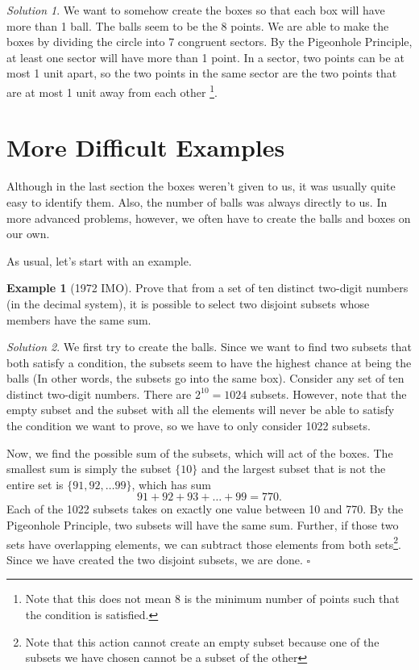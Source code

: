 \documentclass[l1pt]{article}
\theoremstyle{plain}
\theoremstyle{definition}
\newtheorem{example}[thm]{Example}
\theoremstyle{remark}
\newtheorem*{solution}{Solution}
\begin{document}
\begin{solution}
We want to somehow create the boxes so that each box will have more than 1 ball. The balls seem to be the 8 points. We are able to make the boxes by dividing the circle into 7 congruent sectors. By the Pigeonhole Principle, at least one sector will have more than 1 point. In a sector, two points can be at most 1 unit apart, so the two points in the same sector are the two points that are at most 1 unit away from each other \footnote{Note that this does not mean 8 is the minimum number of points such that the condition is satisfied.}. 
\end{solution}

\bigskip

\section{More Difficult Examples}

Although in the last section the boxes weren't given to us, it was usually quite easy to identify them. Also, the number of balls was always directly to us. In more advanced problems, however, we often have to create the balls and boxes on our own. 

\bigskip

As usual, let's start with an example.

\begin{example}[1972 IMO]
Prove that from a set of ten distinct two-digit numbers (in the decimal system), it is possible to select two disjoint subsets whose members have the same sum.
\end{example}

\begin{solution}
We first try to create the balls. Since we want to find two subsets that both satisfy a condition, the subsets seem to have the highest chance at being the balls (In other words, the subsets go into the same box). Consider any set of ten distinct two-digit numbers. There are $2^{10}=1024$ subsets. However, note that the empty subset and the subset with all the elements will never be able to satisfy the condition we want to prove, so we have to only consider 1022 subsets.

Now, we find the possible sum of the subsets, which will act of the boxes. The smallest sum is simply the subset $\{10\}$ and the largest subset that is not the entire set is $\{91, 92, \dots 99\}$, which has sum \[91+92+93+\dots+99=770.\] Each of the 1022 subsets takes on exactly one value between 10 and 770. By the Pigeonhole Principle, two subsets will have the same sum. Further, if those two sets have overlapping elements, we can subtract those elements from both sets\footnote{Note that this action cannot create an empty subset because one of the subsets we have chosen cannot be a subset of the other}. Since we have created the two disjoint subsets, we are done. $\square$
\end{solution}
\end{document}

